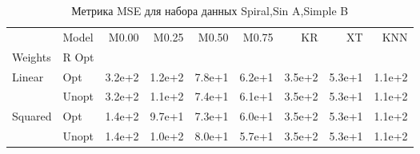 \begin{table}
\caption{Метрика MSE для набора данных Spiral,Sin A,Simple B}
\label{tab:MSE_Spiral,Sin A,Simple B}
\begin{tabular}{llrrrrrrr}
\toprule
 & Model & M0.00 & M0.25 & M0.50 & M0.75 & KR & XT & KNN \\
Weights & R Opt &  &  &  &  &  &  &  \\
\midrule
\multirow[t]{2}{*}{Linear} & Opt & 3.2e+2 & 1.2e+2 & 7.8e+1 & 6.2e+1 & 3.5e+2 & 5.3e+1 & 1.1e+2 \\
 & Unopt & 3.2e+2 & 1.1e+2 & 7.4e+1 & 6.1e+1 & 3.5e+2 & 5.3e+1 & 1.1e+2 \\

\multirow[t]{2}{*}{Squared} & Opt & 1.4e+2 & 9.7e+1 & 7.3e+1 & 6.0e+1 & 3.5e+2 & 5.3e+1 & 1.1e+2 \\
 & Unopt & 1.4e+2 & 1.0e+2 & 8.0e+1 & 5.7e+1 & 3.5e+2 & 5.3e+1 & 1.1e+2 \\

\bottomrule
\end{tabular}
\end{table}
